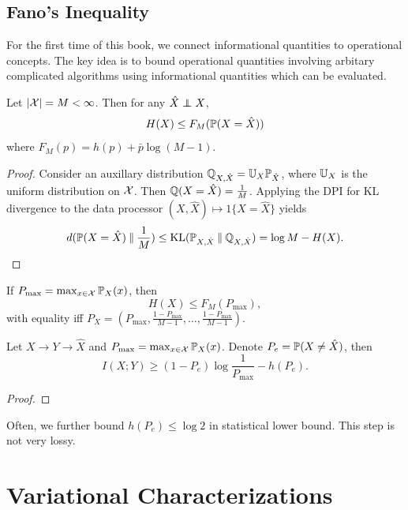 \subsection{Fano's Inequality}

For the first time of this book, we connect informational quantities to operational concepts.
The key idea is to bound operational quantities involving arbitary complicated algorithms using informational quantities which can be evaluated.

\begin{proposition}
    Let $|\mathcal{X}|=M<\infty$. Then for any $\hat{X}\perp\!\!\!\!\perp X$,
    \[H(X)\leq F_M(\mathbb{P}(X=\hat{X}))\]
    where $F_M(p)=h(p)+\bar{p}\log(M-1)$.
\end{proposition}
\begin{proof}
    Consider an auxillary distribution $\mathbb{Q}_{X,\hat X}=\mathbb{U}_X\mathbb{P}_{\hat X}$, where $\mathbb{U}_X$ is the uniform distribution on $\mathcal{X}$.
    Then $\mathbb{Q}(X=\hat X)=\frac{1}{M}$. Applying the DPI for KL divergence to the data processor $(X,\hat X)\mapsto 1\{X=\hat X\}$ yields 
    \[d(\mathbb{P}(X=\hat{X})\mathbin{\|}\frac{1}{M})\leq \operatorname{KL}(\mathbb{P}_{X,\hat{X}}\mathbin{\|} \mathbb{Q}_{X,\hat{X}})=\log M-H(X).\]
\end{proof}
\begin{corollary}
    If $P_{\text{max}} =\max_{x\in\mathcal{X}}\mathbb{P}_X(x)$, then $$H(X)\leq F_M(P_{\text{max}}),$$ with equality iff $P_X=(P_{\text{max}},\frac{1-P_{\text{max}}}{M-1},\dots,\frac{1-P_{\text{max}}}{M-1})$.
\end{corollary}

\begin{theorem}
    Let $X\to Y\to \hat{X}$ and $P_{\text{max}} =\max_{x\in\mathcal{X}}\mathbb{P}_X(x)$.
    Denote $P_e=\mathbb{P}(X\neq\hat X)$, then 
    \[I(X;Y)\geq (1-P_e)\log \frac{1}{P_{\text{max}}}-h(P_e).\]
\end{theorem}
\begin{proof}
    
\end{proof}
Often, we further bound $h(P_e)\leq \log 2$ in statistical lower bound. 
This step is not very lossy.

\section{Variational Characterizations}

